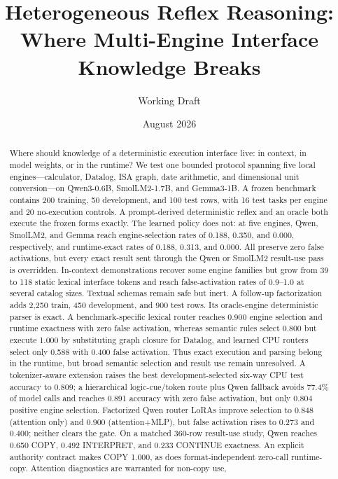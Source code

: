 \documentclass[10pt]{article}
\title{Heterogeneous Reflex Reasoning:\\Where Multi-Engine Interface Knowledge Breaks}
\author{Working Draft}
\date{August 2026}
\begin{document}
\maketitle

\begin{abstract}
Where should knowledge of a deterministic execution interface live: in context,
in model weights, or in the runtime?  We test one bounded protocol spanning five
local engines---calculator, Datalog, ISA graph, date arithmetic, and dimensional
unit conversion---on Qwen3-0.6B, SmolLM2-1.7B, and Gemma3-1B.  A frozen benchmark
contains 200 training, 50 development, and 100 test rows, with 16 test tasks per
engine and 20 no-execution controls.  A prompt-derived deterministic reflex and
an oracle both execute the frozen forms exactly.  The learned policy does not:
at five engines, Qwen, SmolLM2, and Gemma reach engine-selection rates of 0.188,
0.350, and 0.000, respectively, and runtime-exact rates of 0.188, 0.313, and
0.000.  All preserve zero false activations, but every exact result sent through
the Qwen or SmolLM2 result-use pass is overridden.  In-context demonstrations
recover some engine families but grow from 39 to 118 static lexical interface
tokens and reach false-activation rates of 0.9--1.0 at several catalog sizes.
Textual schemas remain safe but inert.  A follow-up factorization adds 2,250
train, 450 development, and 900 test rows.  Its oracle-engine deterministic
parser is exact.  A benchmark-specific lexical router reaches 0.900 engine
selection and runtime exactness with zero false activation, whereas semantic
rules select 0.800 but execute 1.000 by substituting graph closure for Datalog,
and learned CPU routers select only 0.588 with 0.400 false activation.  Thus
exact execution and parsing belong in the runtime, but broad semantic selection
and result use remain unresolved. A tokenizer-aware extension raises the best
development-selected six-way CPU test accuracy to 0.809; a hierarchical
logic-cue/token route plus Qwen fallback avoids 77.4\% of model calls and reaches
0.891 accuracy with zero false activation, but only 0.804 positive engine
selection. Factorized Qwen router LoRAs improve selection
to 0.848 (attention only) and 0.900 (attention+MLP), but false activation rises
to 0.273 and 0.400; neither clears the gate.  On a matched 360-row result-use
study, Qwen reaches 0.650 COPY, 0.492 INTERPRET, and 0.233 CONTINUE exactness.
An explicit authority contract makes COPY 1.000, as does format-independent
zero-call runtime-copy.  Attention diagnostics are warranted for non-copy use,

\end{abstract}
\end{document}
